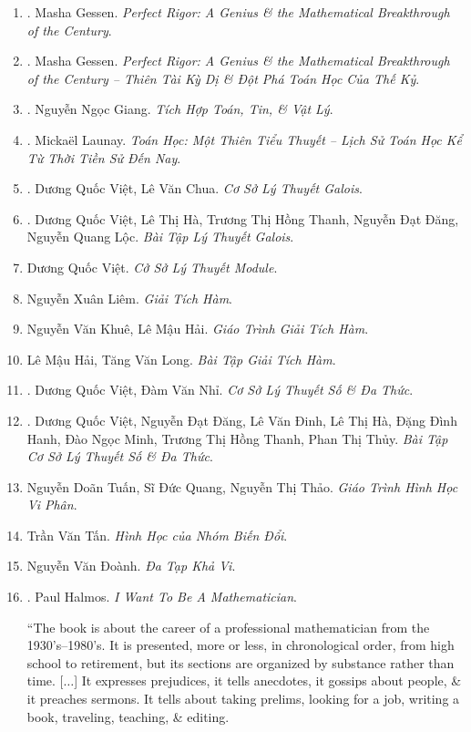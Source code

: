 \documentclass{article}
\begin{document}
\begin{enumerate}
	\item \cite{Gessen2009}. Masha Gessen. {\it Perfect Rigor: A Genius \& the Mathematical Breakthrough of the Century}.\hfill{\sf[done]}
	\item \cite{Gessen2022}. Masha Gessen. {\it Perfect Rigor: A Genius \& the Mathematical Breakthrough of the Century -- Thiên Tài Kỳ Dị \& Đột Phá Toán Học Của Thế Kỷ}.\hfill{\sf[reading]}
	\item \cite{Giang_tich_hop_Toan_Tin_Ly}. Nguyễn Ngọc Giang. {\it Tích Hợp Toán, Tin, \& Vật Lý}.\hfill{\sf[reading]}
	\item \cite{Launay2022}. Micka\"el Launay. {\it Toán Học: Một Thiên Tiểu Thuyết -- Lịch Sử Toán Học Kể Từ Thời Tiền Sử Đến Nay}.\hfill{\sf[done]}
	\item \cite{Viet_Chua2022}. Dương Quốc Việt, Lê Văn Chua. {\it Cơ Sở Lý Thuyết Galois}.\hfill{\sf[reading]}
	\item \cite{Viet_Ha_Thanh_Dang_Loc2022}. Dương Quốc Việt, Lê Thị Hà, Trương Thị Hồng Thanh, Nguyễn Đạt Đăng, Nguyễn Quang Lộc. {\it Bài Tập Lý Thuyết Galois}.\hfill{\sf[reading]}
	\item Dương Quốc Việt. {\it Cở Sở Lý Thuyết Module}.
	\item Nguyễn Xuân Liêm. {\it Giải Tích Hàm}.
	\item Nguyễn Văn Khuê, Lê Mậu Hải. {\it Giáo Trình Giải Tích Hàm}.
	\item Lê Mậu Hải, Tăng Văn Long. {\it Bài Tập Giải Tích Hàm}.
	\item \cite{Viet_Nhi2022}. Dương Quốc Việt, Đàm Văn Nhỉ. {\it Cơ Sở Lý Thuyết Số \& Đa Thức}.\hfill{\sf[reading]}
	\item \cite{Viet_Dang_Dinh_Ha_Hanh_Minh_Thanh_Thuy2022}. Dương Quốc Việt, Nguyễn Đạt Đăng, Lê Văn Đinh, Lê Thị Hà, Đặng Đình Hanh, Đào Ngọc Minh, Trương Thị Hồng Thanh, Phan Thị Thủy. {\it Bài Tập Cơ Sở Lý Thuyết Số \& Đa Thức}.\hfill{\sf[reading]}
	\item Nguyễn Doãn Tuấn, Sĩ Đức Quang, Nguyễn Thị Thảo. {\it Giáo Trình Hình Học Vi Phân}.
	\item Trần Văn Tấn. {\it Hình Học của Nhóm Biến Đổi}.
	\item Nguyễn Văn Đoành. {\it Đa Tạp Khả Vi}.
	\item \cite{Halmos1985}. {\sc Paul Halmos}. {\it I Want To Be A Mathematician}.
	
	``The book is about the career of a professional mathematician from the 1930's--1980's. It is presented, more or less, in chronological order, from high school to retirement, but its sections are organized by substance rather than time. [$\ldots$] It expresses prejudices, it tells anecdotes, it gossips about people, \& it preaches sermons. It tells about taking prelims, looking for a job, writing a book, traveling, teaching, \& editing.
	

\end{enumerate}
\end{document}
